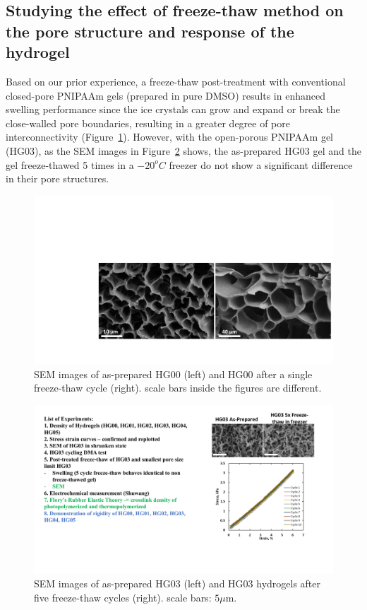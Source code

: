 \subsection{Studying the effect of freeze-thaw method on the pore structure and response of the hydrogel}
Based on our prior experience, a freeze-thaw post-treatment with conventional closed-pore PNIPAAm gels (prepared in pure DMSO) results in enhanced swelling performance since the ice crystals can grow and expand or break the close-walled pore boundaries, resulting in a greater degree of pore interconnectivity (Figure~\ref{fig:freeze}). However, with the open-porous PNIPAAm gel (HG03), as the SEM images in Figure~\ref{fig:freeze1} shows, the as-prepared HG03 gel and the gel freeze-thawed 5 times in a $-20^{o}C$ freezer do not show a significant difference in their pore structures.

\begin{figure}[!th]
      \centering
      \includegraphics[width=\textwidth]{freeze.pdf}
      \caption{SEM images of as-prepared HG00 (left) and HG00 after a single freeze-thaw cycle (right). scale bars inside the figures are different.}
      \label{fig:freeze}
\end{figure}

\begin{figure}[!th]
      \centering
      \includegraphics[width=\textwidth]{freeze1.pdf}
      \caption{SEM images of as-prepared HG03 (left)  and HG03 hydrogels after five freeze-thaw cycles (right). scale bars: $5\mu$m.}
      \label{fig:freeze1}
\end{figure}

